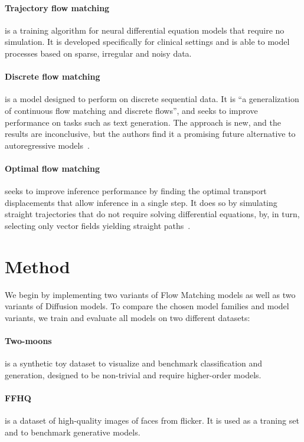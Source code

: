 \documentclass{article}
\begin{document}
\paragraph{Trajectory flow matching} is a training algorithm for neural differential equation models that require no simulation. It is developed specifically for clinical settings and is able to model processes based on sparse, irregular and noisy data. \cite{zhang2024trajectory}

\paragraph{Discrete flow matching} is a model designed to perform on discrete sequential data. It is ``a generalization of continuous flow matching and discrete flows'', and seeks to improve performance on tasks such as text generation. The approach is new, and the results are inconclusive, but the authors find it a promising future alternative to autoregressive models~\cite{gat2024discrete}.

\paragraph{Optimal flow matching} seeks to improve inference performance by finding the optimal transport displacements that allow inference in a single step. It does so by simulating straight trajectories that do not require solving differential equations, by, in turn, selecting only vector fields yielding straight paths~\cite{kornilov2024optimal}.

\section{Method}

We begin by implementing two variants of Flow Matching models as well as two variants of Diffusion models. To compare the chosen model families and model variants, we train and evaluate all models on two different datasets:

\paragraph{Two-moons} is a synthetic toy dataset to visualize and benchmark classification and generation, designed to be non-trivial and require higher-order models.

\paragraph{FFHQ} is a dataset of high-quality images of faces from flicker. It is used as a traning set and to benchmark generative models.
\end{document}
